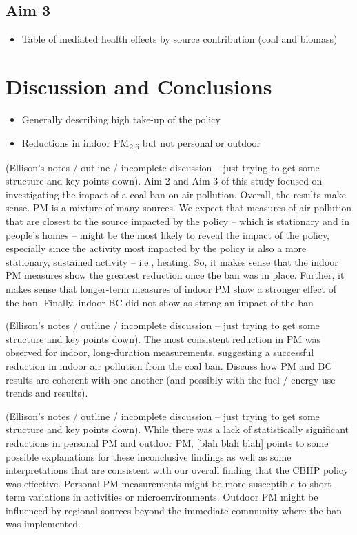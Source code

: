 \documentclass[
  letterpaper,
  DIV=11,
  numbers=noendperiod]{scrartcl}
\providecommand{\tightlist}{%
  \setlength{\itemsep}{0pt}\setlength{\parskip}{0pt}}\usepackage{longtable,booktabs,array}
\begin{document}
\hypertarget{aim-3}{%
\subsection{Aim 3}\label{aim-3}}

\begin{itemize}
\tightlist
\item
  Table of mediated health effects by source contribution (coal and
  biomass)
\end{itemize}

\hypertarget{discussion-and-conclusions}{%
\section{Discussion and Conclusions}\label{discussion-and-conclusions}}

\begin{itemize}
\tightlist
\item
  Generally describing high take-up of the policy
\item
  Reductions in indoor PM\textsubscript{2.5} but not personal or outdoor
\end{itemize}

(Ellison's notes / outline / incomplete discussion -- just trying to get
some structure and key points down). Aim 2 and Aim 3 of this study
focused on investigating the impact of a coal ban on air pollution.
Overall, the results make sense. PM is a mixture of many sources. We
expect that measures of air pollution that are closest to the source
impacted by the policy -- which is stationary and in people's homes --
might be the most likely to reveal the impact of the policy, especially
since the activity most impacted by the policy is also a more
stationary, sustained activity -- i.e., heating. So, it makes sense that
the indoor PM measures show the greatest reduction once the ban was in
place. Further, it makes sense that longer-term measures of indoor PM
show a stronger effect of the ban. Finally, indoor BC did not show as
strong an impact of the ban

(Ellison's notes / outline / incomplete discussion -- just trying to get
some structure and key points down). The most consistent reduction in PM
was observed for indoor, long-duration measurements, suggesting a
successful reduction in indoor air pollution from the coal ban. Discuss
how PM and BC results are coherent with one another (and possibly with
the fuel / energy use trends and results).

(Ellison's notes / outline / incomplete discussion -- just trying to get
some structure and key points down). While there was a lack of
statistically significant reductions in personal PM and outdoor PM,
{[}blah blah blah{]} points to some possible explanations for these
inconclusive findings as well as some interpretations that are
consistent with our overall finding that the CBHP policy was effective.
Personal PM measurements might be more susceptible to short-term
variations in activities or microenvironments. Outdoor PM might be
influenced by regional sources beyond the immediate community where the
ban was implemented.
\end{document}
